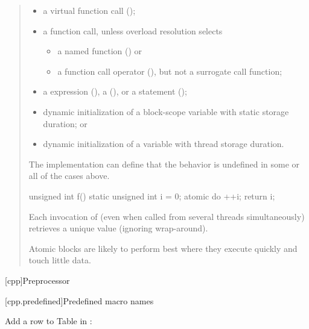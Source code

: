 \begin{quote}
\begin{itemize}
\item
  a virtual function call ();
\item
  a function call, unless overload resolution selects

  \begin{itemize}
  \item
    a named function () or
  \item
    a function call operator (),
    but not a surrogate call function;
  \end{itemize}
\item
  a  expression (), a
   (), or a
   statement ();
\item
  dynamic initialization of a block-scope variable with static storage
  duration; or
\item
  dynamic initialization of a variable with thread storage duration.
\end{itemize}

\begin{note}
The implementation can define that the behavior is
undefined in some or all of the cases above.
\end{note}

\begin{example}
\begin{codeblock}
unsigned int f()
{
  static unsigned int i = 0;
  atomic do {
    ++i;
    return i;
  }
}
\end{codeblock}

Each invocation of 
(even when called from several threads simultaneously)
retrieves a unique value (ignoring wrap-around).
\end{example}

\begin{note}
Atomic blocks are likely to perform best where they execute
quickly and touch little data.
\end{note}
\end{quote}

\setcounter{chapter}{14}

[cpp]{Preprocessor}

\setcounter{section}{10}

[cpp.predefined]{Predefined macro names}

Add a row to Table  in :


